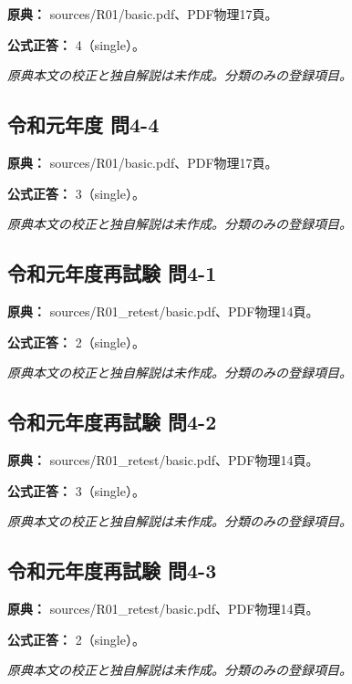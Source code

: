 \noindent\textbf{原典：} sources/R01/basic.pdf、PDF物理17頁。

\textbf{公式正答：} 4（single）。

\par\textit{原典本文の校正と独自解説は未作成。分類のみの登録項目。}

\subsection{令和元年度 問4-4}
\label{q:r01-reg-basic-4-4}

\noindent\textbf{原典：} sources/R01/basic.pdf、PDF物理17頁。

\textbf{公式正答：} 3（single）。

\par\textit{原典本文の校正と独自解説は未作成。分類のみの登録項目。}

\subsection{令和元年度再試験 問4-1}
\label{q:r01-ret-basic-4-1}

\noindent\textbf{原典：} sources/R01\_retest/basic.pdf、PDF物理14頁。

\textbf{公式正答：} 2（single）。

\par\textit{原典本文の校正と独自解説は未作成。分類のみの登録項目。}

\subsection{令和元年度再試験 問4-2}
\label{q:r01-ret-basic-4-2}

\noindent\textbf{原典：} sources/R01\_retest/basic.pdf、PDF物理14頁。

\textbf{公式正答：} 3（single）。

\par\textit{原典本文の校正と独自解説は未作成。分類のみの登録項目。}

\subsection{令和元年度再試験 問4-3}
\label{q:r01-ret-basic-4-3}

\noindent\textbf{原典：} sources/R01\_retest/basic.pdf、PDF物理14頁。

\textbf{公式正答：} 2（single）。

\par\textit{原典本文の校正と独自解説は未作成。分類のみの登録項目。}

